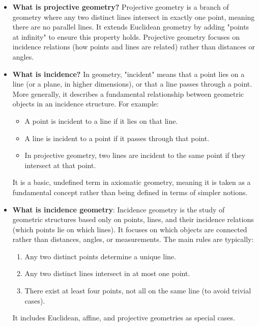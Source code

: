 \documentclass{report}
\begin{document}
    \begin{itemize}
        \item \textbf{What is projective geometry?} Projective geometry is a branch of geometry where any two distinct lines intersect in exactly one point, meaning there are no parallel lines. It extends Euclidean geometry by adding "points at infinity" to ensure this property holds. Projective geometry focuses on incidence relations (how points and lines are related) rather than distances or angles.
        \item \textbf{What is incidence?} In geometry, "incident" means that a point lies on a line (or a plane, in higher dimensions), or that a line passes through a point. More generally, it describes a fundamental relationship between geometric objects in an incidence structure.
            \bigbreak \noindent 
            For example:
            \begin{itemize}
                \item A point is incident to a line if it lies on that line.
                \item A line is incident to a point if it passes through that point.
                \item In projective geometry, two lines are incident to the same point if they intersect at that point.
            \end{itemize}
            \bigbreak \noindent 
            It is a basic, undefined term in axiomatic geometry, meaning it is taken as a fundamental concept rather than being defined in terms of simpler notions.
        \item \textbf{What is incidence geometry}: Incidence geometry is the study of geometric structures based only on points, lines, and their incidence relations (which points lie on which lines). It focuses on which objects are connected rather than distances, angles, or measurements. The main rules are typically:
            \begin{enumerate}
                \item Any two distinct points determine a unique line.
                \item Any two distinct lines intersect in at most one point.
                \item There exist at least four points, not all on the same line (to avoid trivial cases).
            \end{enumerate}
            \bigbreak \noindent 
            It includes Euclidean, affine, and projective geometries as special cases.


\end{itemize}
\end{document}
